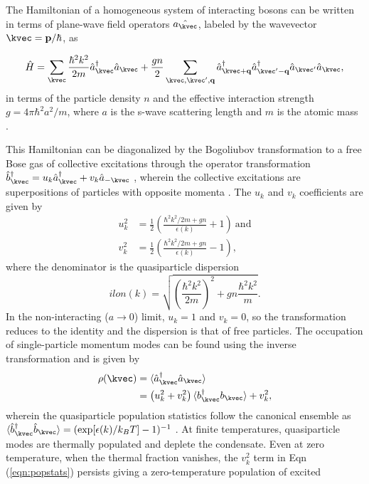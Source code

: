 	The Hamiltonian of a homogeneous system of interacting bosons can be written in terms of plane-wave field operators $\hat{a_\kvec}$, labeled by the wavevector $\kvec=\textbf{p}/\hbar$, as

	\begin{equation}
		\hat{H} = \sum_{\kvec} \frac{\hbar^2k^2}{2m}\hat{a}_{\kvec}^\dagger \hat{a}_\kvec + \frac{g n}{2}\sum_{\kvec,\kvec',{\bf q}}\hat{a}_{\kvec+{\bf q}}^\dagger\hat{a}_{\kvec'-{\bf q}}^\dagger \hat{a}_{\kvec'}\hat{a}_{\kvec},
	\end{equation}
	in terms of the particle density $n$ and the effective interaction strength $g=4\pi\hbar^2a^2/m$, where $a$ is the s-wave scattering length and $m$ is the atomic mass \cite{PitaevskiiStringari,PethickSmith}.
   
    This Hamiltonian can be diagonalized by the Bogoliubov transformation to a free Bose gas of collective excitations through the operator transformation $\hat{b}_{\kvec}^\dagger = u_k \hat{a}_\kvec^\dagger + v_k \hat{a}_{-\kvec}$ \cite{Bogolubov47,PethickSmith}, wherein the collective excitations are superpositions of particles with opposite momenta \cite{Vogels02}. 
    The $u_k$ and $v_k$ coefficients are given by
	\begin{align}
		u_{k}^2 &= \frac{1}{2}\left(\frac{\hbar^2k^2/2m + gn}{\epsilon(k)} + 1\right)~\textrm{and}\\
		v_{k}^2 &= \frac{1}{2}\left(\frac{\hbar^2k^2/2m + gn}{\epsilon(k)} - 1\right),
	\end{align}
	where the denominator is the quasiparticle dispersion
	\begin{equation}
		ilon(k) = \sqrt{\left(\frac{\hbar^2k^2}{2m}\right)^2 + gn\frac{ \hbar^2k^2}{m}}.
	\end{equation}
	In the non-interacting ($a\rightarrow0$) limit, $u_k=1$ and $v_k=0$, so the transformation reduces to the identity and the dispersion is that of free particles. 
	The occupation of single-particle momentum modes can be found using the inverse transformation and is given by
	 \begin{align}
	 \rho(\kvec) &= \langle\hat{a}_\kvec^\dagger\hat{a}_\kvec\rangle\\
		 &=\left(u_{k}^{2}+v_{k}^{2}\right)\langle b_{\kvec}^{\dagger}b_{\kvec}\rangle + v_{k}^{2},
		 \label{eqn:popstats}
	 \end{align}
	wherein the quasiparticle population statistics follow the canonical ensemble as $\langle \hat{b}^\dagger_\kvec\hat{b}_\kvec\rangle = (\exp[\epsilon(k)/k_B T]-1)^{-1}$ \cite{PitaevskiiStringari,Chang16}. At finite temperatures, quasiparticle modes are thermally populated and deplete the condensate.  Even at zero temperature, when the thermal fraction vanishes, the $v_k^2$ term in Eqn (\ref{eqn:popstats}) persists giving a zero-temperature population of excited %
